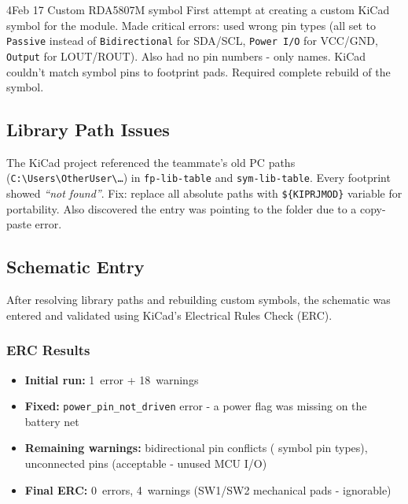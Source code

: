 \begin{logentry}{4}{Feb 17 \textbullet{} Custom RDA5807M symbol}
First attempt at creating a custom KiCad symbol for the  module.
Made critical errors: used wrong pin types (all set to \texttt{Passive} instead
of \texttt{Bidirectional} for SDA/SCL, \texttt{Power I/O} for VCC/GND,
\texttt{Output} for LOUT/ROUT).  Also had no pin numbers - only names.  KiCad
couldn't match symbol pins to footprint pads.  Required complete rebuild of the
symbol.
\end{logentry}

\subsection{Library Path Issues}

\begin{calloutwarn}
The KiCad project referenced the teammate's old PC paths
(\texttt{C:\textbackslash Users\textbackslash OtherUser\textbackslash\ldots})
in \texttt{fp-lib-table} and \texttt{sym-lib-table}.  Every footprint showed
\emph{``not found''}.  Fix: replace all absolute paths with
\texttt{\$\{KIPRJMOD\}} variable for portability.  Also discovered the
 entry was pointing to the  folder due to a
copy-paste error.
\end{calloutwarn}

\subsection{Schematic Entry}

After resolving library paths and rebuilding custom symbols, the schematic was
entered and validated using KiCad's Electrical Rules Check (ERC).

\subsubsection{ERC Results}

\begin{itemize}[leftmargin=1.8em, itemsep=2pt]
  \item \textbf{Initial run:} 1~error + 18~warnings
  \item \textbf{Fixed:} \texttt{power\_pin\_not\_driven} error - a power flag
        was missing on the battery net
  \item \textbf{Remaining warnings:} bidirectional pin conflicts
        ( symbol pin types), unconnected pins (acceptable -
        unused MCU I/O)
  \item \textbf{Final ERC:} 0~errors, 4~warnings (SW1/SW2 mechanical pads -
        ignorable)
\end{itemize}

